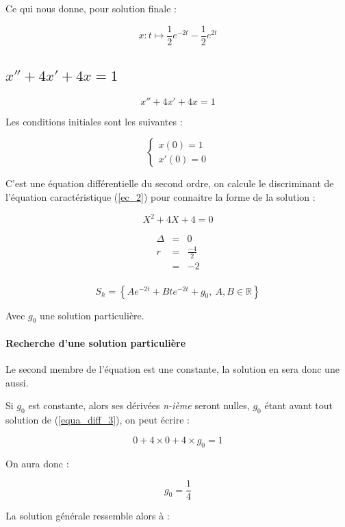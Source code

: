 \documentclass[a4paper, 11pt]{report} %
\newcommand{\R}{\mathbb{R}}
\renewcommand{\mapsto}{\longmapsto}
\begin{document}
Ce qui nous donne, pour solution finale :

\[
x : t \mapsto \frac{1}{2}e^{-2t} - \frac{1}{2}e^{2t}
\]
\subsection{$x'' + 4x' + 4x = 1$} %

\begin{equation}
x'' + 4x' + 4x = 1
\label{equa_diff_3}
\end{equation}

Les conditions initiales sont les suivantes :

\[
\left\{\begin{array}{l}
x(0) = 1\\
x'(0) = 0
\end{array}\right.
\]

C'est une équation différentielle du second ordre, on calcule le discriminant de l'équation caractéristique (\ref{ec_2})
pour connaitre la forme de la solution :

\begin{equation}
X^2 + 4X + 4 = 0
\label{ec_2}
\end{equation}

\begin{eqnarray*}
    \Delta & = & 0\\
    r & = & \frac{-4}{2}\\
    & = & -2\\
\end{eqnarray*}

\[
S_h = \left\{Ae^{-2t} + Bte^{-2t} + g_0,~A,B\in\R\right\}
\]

Avec $g_0$ une solution particulière.

\paragraph{Recherche d'une solution particulière}

Le second membre de l'équation est une constante, la solution en sera donc une aussi.

Si $g_0$ est constante, alors ses dérivées \textit{n-ième} seront nulles, $g_0$ étant avant tout solution de
(\ref{equa_diff_3}), on peut écrire :

\[ 0 + 4\times0 + 4\times g_0 = 1 \]

On aura donc :

\[
g_0 = \frac{1}{4}
\]


La solution générale ressemble alors à :
\end{document}

